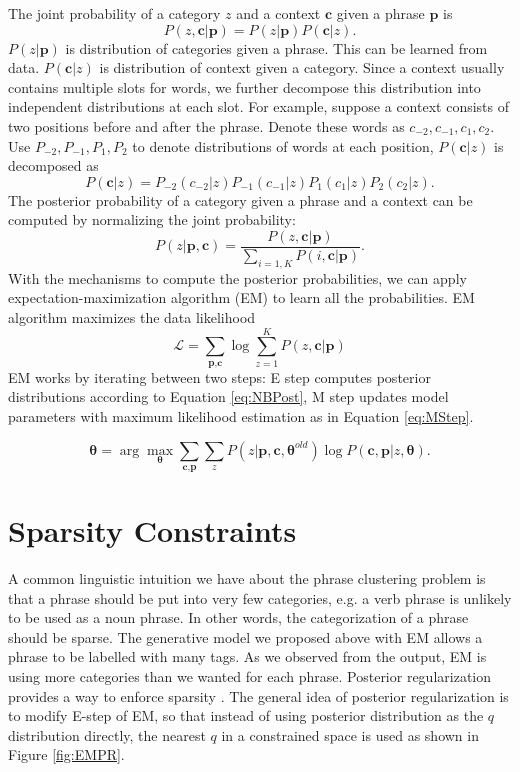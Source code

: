 The joint probability of a category $z$ and a context $\textbf{c}$ 
given a phrase $\textbf{p}$ is
\begin{equation}\label{eq:NBPost}
P(z,\textbf{c}|\textbf{p})=P(z|\textbf{p})P(\textbf{c}|z).
\end{equation}
$P(z|\textbf{p})$ is distribution of categories given a phrase.
This can be learned from data.
$P(\textbf{c}|z)$ is distribution of context given a category.
Since a context usually contains multiple slots for words, we further
decompose this distribution into independent distributions at
each slot. For example, suppose a context consists of two positions 
before and after the phrase. Denote these words as 
$c_{-2},c_{-1},c_1,c_2$.
Use $P_{-2},P_{-1},P_1,P_2$ to denote distributions of words at each 
position, $P(\textbf{c}|z)$ is decomposed as
\[
P(\textbf{c}|z)=P_{-2}(c_{-2}|z)P_{-1}
(c_{-1}|z)P_1(c_1|z)P_2(c_2|z).
\]
The posterior probability of a category given a phrase
and a context can be computed by normalizing the joint probability:
\[
P(z|\textbf{p},\textbf{c})=\frac{P(z,\textbf{c}|\textbf{p})}
{\sum_{i=1,K}P(i,\textbf{c}|\textbf{p})}.
\]
With the mechanisms to compute the posterior probabilities, we can 
apply expectation-maximization algorithm (EM)
 to learn all the probabilities.
EM algorithm maximizes the data likelihood
\[
\mathcal{L}=
\sum_{\textbf{p},\textbf{c}}
\log \sum_{z=1}^K P(z,\textbf{c}|\textbf{p})
\]
EM works by iterating between two steps:
E step computes posterior 
distributions according to Equation \ref{eq:NBPost},
M step updates model parameters with maximum likelihood
estimation as in Equation \ref{eq:MStep}.

\begin{equation}\label{eq:MStep}
\boldsymbol{\theta}=
\arg\max_{\boldsymbol{\theta}}
\sum_{\textbf{c},\textbf{p}}\sum_z
P(z|\textbf{p},\textbf{c},
\boldsymbol\theta^{old})\log
P(\textbf{c},\textbf{p}|z,\boldsymbol{\theta}).
\end{equation}

\section{Sparsity Constraints}\label{sec:pr-sparse}
A common linguistic intuition we have about the phrase 
clustering problem is that a phrase should be put into very
few categories, e.g. a verb phrase is unlikely to be used as 
a noun phrase. In other words, the categorization of
a phrase should be sparse.
The generative model we proposed above with EM
allows a phrase to be labelled with many tags. As we observed
from the output, EM is using more categories than we wanted for
each phrase.
Posterior regularization
provides a way to enforce sparsity \citep{ganchev:penn:2009}.
The general idea of posterior regularization is to modify
E-step of EM, so that instead of using posterior distribution
as the $q$ distribution directly, the nearest
$q$
in a constrained space is used
 as shown in Figure \ref{fig:EMPR}.

